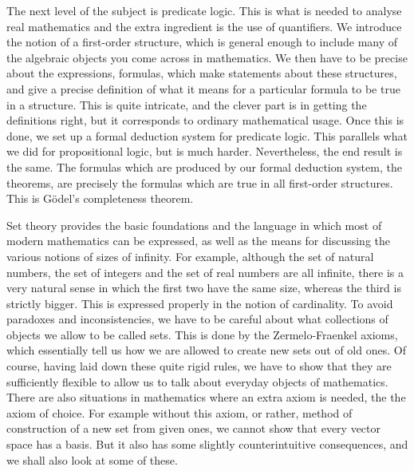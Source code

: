 The next level of the subject is predicate logic. This is what is needed to analyse real mathematics and the extra ingredient is the use of quantifiers. We introduce the notion of a first-order structure, which is general enough to include many of the algebraic objects you come across in mathematics. We then have to be precise about the expressions, formulas, which make statements about these structures, and give a precise definition of what it means for a particular formula to be true in a structure. This is quite intricate, and the clever part is in getting the definitions right, but it corresponds to ordinary mathematical usage. Once this is done, we set up a formal deduction system for predicate logic. This parallels what we did for propositional logic, but is much harder. Nevertheless, the end result is the same. The formulas which are produced by our formal deduction system, the theorems, are precisely the formulas which are true in all first-order structures. This is G\"odel's completeness theorem.

Set theory provides the basic foundations and the language in which most of modern mathematics can be expressed, as well as the means for discussing the various notions of sizes of infinity. For example, although the set of natural numbers, the set of integers and the set of real numbers are all infinite, there is a very natural sense in which the first two have the same size, whereas the third is strictly bigger. This is expressed properly in the notion of cardinality. To avoid paradoxes and inconsistencies, we have to be careful about what collections of objects we allow to be called sets. This is done by the Zermelo-Fraenkel axioms, which essentially tell us how we are allowed to create new sets out of old ones. Of course, having laid down these quite rigid rules, we have to show that they are sufficiently flexible to allow us to talk about everyday objects of mathematics. There are also situations in mathematics where an extra axiom is needed, the the axiom of choice. For example without this axiom, or rather, method of construction of a new set from given ones, we cannot show that every vector space has a basis. But it also has some slightly counterintuitive consequences, and we shall also look at some of these.

